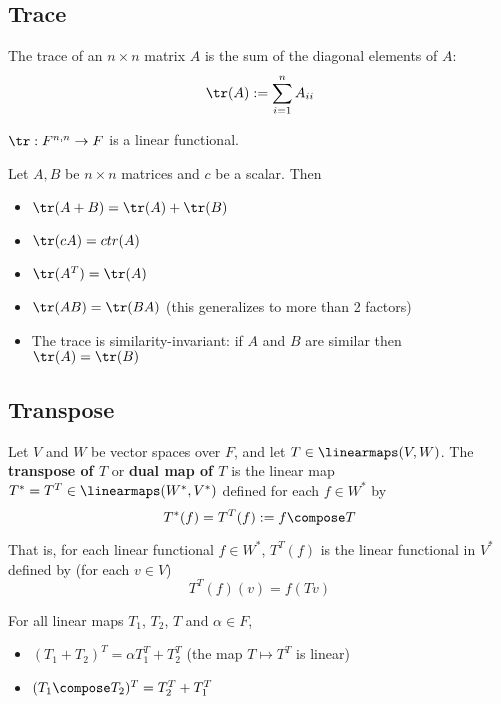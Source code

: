\subsection{Trace}

\begin{definition}
  The trace of an $n \times n$ matrix $A$ is the sum of the diagonal elements of $A$:
  \[
    \tr(A) := \sum_{i = 1}^n A_{ii}
  \]

  $\tr : F^{n,n} \to F$ is a linear functional.
\end{definition}

\begin{theorem}
  Let $A, B$ be $n \times n$ matrices and $c$ be a scalar. Then
  \begin{itemize}
    \item $\tr(A + B) = \tr(A) + \tr(B)$
    \item $\tr(cA) = c tr(A)$
    \item $\tr(A^T) = \tr(A)$
    \item $\tr(AB) = \tr(BA)$ (this generalizes to more than 2 factors)
    \item The trace is similarity-invariant: if $A$ and $B$ are similar then $\tr(A) = \tr(B)$
  \end{itemize}
\end{theorem}

\subsection{Transpose}

\begin{definition}
  Let $V$ and $W$ be vector spaces over $F$, and let $T \in \linearmaps(V, W)$. The \textbf{transpose of $T$} or \textbf{dual map of $T$} is the linear map $T^* = T^T \in \linearmaps(W^*, V^*)$ defined for each $f \in W^*$ by
  \[
    T^*(f) = T^T(f) := f \compose T
  \]

  That is, for each linear functional $f \in W^*$, $T^T(f)$ is the linear functional in $V^*$ defined by (for each $v \in V$)
  \[
    T^T(f)(v) = f(Tv)
  \]
\end{definition}

\begin{theorem}
  For all linear maps $T_1$, $T_2$, $T$ and $\alpha \in F$,
  \begin{itemize}
    \item $(T_1 + T_2)^T = \alpha T_1^T + T_2^T$ (the map $T \mapsto T^T$ is linear)
    \item $(T_1 \compose T_2)^T = T_2^T + T_1^T$
  \end{itemize}
\end{theorem}

